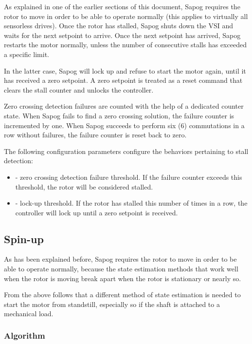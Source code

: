 \documentclass{zubaxdoc}
\begin{document}
As explained in one of the earlier sections of this document,
Sapog requires the rotor to move in order to be able to operate normally
(this applies to virtually all sensorless drives).
Once the rotor has stalled, Sapog shuts down the VSI and waits for the next setpoint to arrive.
Once the next setpoint has arrived, Sapog restarts the motor normally,
unless the number of consecutive stalls has exceeded a specific limit.

In the latter case, Sapog will lock up and refuse to start the motor again,
until it has received a zero setpoint.
A zero setpoint is treated as a reset command that clears the stall counter and unlocks the controller.

Zero crossing detection failures are counted with the help of a dedicated counter state.
When Sapog fails to find a zero crossing solution,
the failure counter is incremented by one.
When Sapog succeeds to perform six (6) commutations in a row without failures,
the failure counter is reset back to zero.

The following configuration parameters configure the behaviors pertaining to stall detection:

\begin{itemize}
	\item {} - zero crossing detection failure threshold.
	If the failure counter exceeds this threshold, the rotor will be considered stalled.
	\item {} - lock-up threshold.
	If the rotor has stalled this number of times in a row,
	the controller will lock up until a zero setpoint is received.
\end{itemize}

\subsection{Spin-up}

As has been explained before, Sapog requires the rotor to move in order to be able to operate normally,
because the state estimation methods that work well when the rotor is moving break apart when the rotor is
stationary or nearly so.

From the above follows that a different method of state estimation is needed to start the motor
from standstill, especially so if the shaft is attached to a mechanical load.

\subsubsection{Algorithm}
\end{document}

